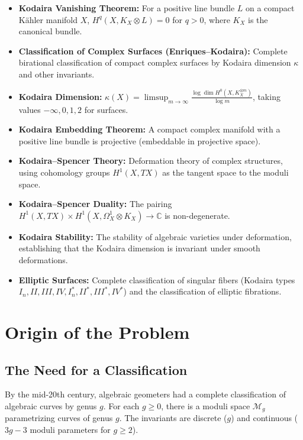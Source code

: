 \begin{itemize}
    \item \textbf{Kodaira Vanishing Theorem:} For a positive line bundle $L$ on a compact K\"{a}hler manifold $X$, $H^q(X, K_X \otimes L) = 0$ for $q > 0$, where $K_X$ is the canonical bundle.
    \item \textbf{Classification of Complex Surfaces (Enriques--Kodaira):} Complete birational classification of compact complex surfaces by Kodaira dimension $\kappa$ and other invariants.
    \item \textbf{Kodaira Dimension:} $\kappa(X) = \limsup_{m \to \infty} \frac{\log \dim H^0(X, K_X^{\otimes m})}{\log m}$, taking values $-\infty, 0, 1, 2$ for surfaces.
    \item \textbf{Kodaira Embedding Theorem:} A compact complex manifold with a positive line bundle is projective (embeddable in projective space).
    \item \textbf{Kodaira--Spencer Theory:} Deformation theory of complex structures, using cohomology groups $H^1(X, TX)$ as the tangent space to the moduli space.
    \item \textbf{Kodaira--Spencer Duality:} The pairing $H^1(X, TX) \times H^1(X, \Omega^1_X \otimes K_X) \to \mathbb{C}$ is non-degenerate.
    \item \textbf{Kodaira Stability:} The stability of algebraic varieties under deformation, establishing that the Kodaira dimension is invariant under smooth deformations.
    \item \textbf{Elliptic Surfaces:} Complete classification of singular fibers (Kodaira types $I_n, II, III, IV, I_n^*, II^*, III^*, IV^*$) and the classification of elliptic fibrations.
\end{itemize}

\section{Origin of the Problem}

\subsection{The Need for a Classification}

By the mid-20th century, algebraic geometers had a complete classification of algebraic curves by genus $g$. For each $g \geq 0$, there is a moduli space $\mathcal{M}_g$ parametrizing curves of genus $g$. The invariants are discrete ($g$) and continuous ($3g-3$ moduli parameters for $g \geq 2$).

